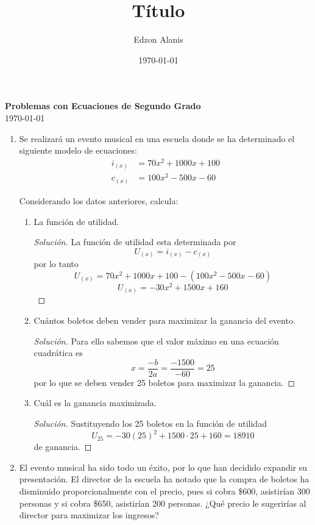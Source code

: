 \documentclass[12pt]{article}
\title{Título}
\author{Edzon Alanis}
\date{\today}
\newenvironment{solution}{\begin{proof}[Solución]}{\end{proof}}
\begin{document}

\begin{center}
    \textbf{\large Problemas con Ecuaciones de Segundo Grado} \\[0.4cm]
    \today
\end{center}

\vspace*{5mm}

\begin{enumerate}
    \item Se realizará un evento musical en una escuela donde se ha determinado el
    siguiente modelo de ecuaciones: \begin{align*}
        i_{(x)} &= 70x^2+1000x+100 \\
        c_{(x)} &= 100x^2-500x-60
    \end{align*}

    Considerando los datos anteriores, calcula: \begin{enumerate}
        \item La función de utilidad. \begin{solution}
            La función de utilidad esta determinada por \[U_{(x)} = i_{(x)}- c_{(x)}\] por lo tanto
            \[U_{(x)} = 70x^2+1000x+100 - (100x^2-500x-60)\] \[U_{(x)} = -30x^2+1500x+160\]
        \end{solution}
        \item Cuántos boletos deben vender para maximizar la ganancia del evento. \begin{solution}
            Para ello sabemos que el valor máximo en una ecuación cuadrática es \[x = \frac{-b}{2a} =  \frac{-1500}{-60} = 25\] por lo que se deben vender 25 boletos para maximizar la ganancia.
        \end{solution}
        \item Cuál es la ganancia maximizada. \begin{solution}
            Sustituyendo los 25 boletos en la función de utilidad \[U_{25} = -30(25)^2+1500\cdot 25+160 = 18910\] de ganancia.
        \end{solution}
    \end{enumerate}

    \newpage

    \item El evento musical ha sido todo un éxito, por lo que han decidido expandir su
    presentación. El director de la escuela ha notado que la compra de boletos ha
    disminuido proporcionalmente con el precio, pues si cobra \$600, asistirían 300
    personas y si cobra \$650, asistirían 200 personas. ¿Qué precio le sugerirías al
    director para maximizar los ingresos?


\end{enumerate}
\end{document}
